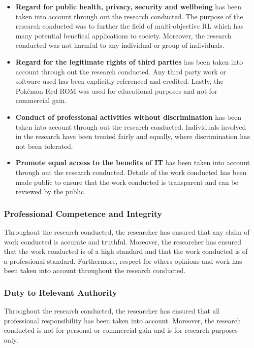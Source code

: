 \begin{itemize}
    \item \textbf{Regard for public health, privacy, security and wellbeing} has been taken into account through out the research conducted. The purpose of the research conducted was to further the field of multi-objective RL which has many potential benefical applications to society. Moreover, the research conducted was not harmful to any individual or group of individuals.
    
    \item \textbf{Regard for the legitimate rights of third parties} has been taken into account through out the research conducted. Any third party work or software used has been explicitly referenced and credited. Lastly, the Pokémon Red ROM was used for educational purposes and not for commercial gain.
    
    \item \textbf{Conduct of professional activities without discrimination} has been taken into account through out the research conducted. Individuals involved in the research have been treated fairly and equally, where discrimination has not been tolerated.

    \item \textbf{Promote equal access to the benefits of IT} has been taken into account through out the research conducted. Details of the work conducted has been made public to ensure that the work conducted is transparent and can be reviewed by the public.
\end{itemize}

\subsubsection{Professional Competence and Integrity}

Throughout the research conducted, the researcher has ensured that any claim of work conducted is accurate and truthful. Moreover, the researcher has ensured that the work conducted is of a high standard and that the work conducted is of a professional standard. Furthermore, respect for others opinions and work has been taken into account throughout the research conducted. 

\subsubsection{Duty to Relevant Authority}

Throughout the research conducted, the researcher has ensured that all professional responsibility has been taken into account. Moreover, the research conducted is not for personal or commercial gain and is for research purposes only. 